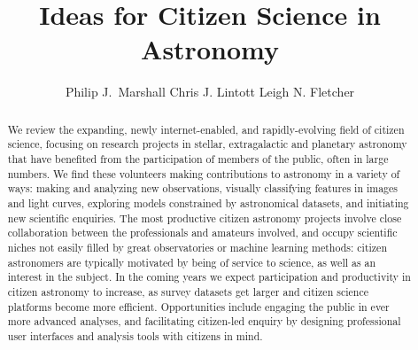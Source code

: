 \documentclass{ar2e}
\def\url#1{\texttt{#1}}
\begin{document}

\jvol{}
\ARinfo{}

\title{Ideas for Citizen Science in Astronomy}

\author{%
Philip J.\ Marshall
Chris J. Lintott
Leigh N. Fletcher
}




\begin{abstract} 

We review the expanding, newly internet-enabled, and rapidly-evolving field of
citizen science, focusing on research projects in stellar, extragalactic and 
planetary astronomy that have benefited from the participation of members of
the public, often in large numbers. We find these volunteers making
contributions to astronomy in a variety of ways: making and analyzing new
observations, visually classifying features in images and light curves,
exploring models constrained by astronomical datasets, and initiating new
scientific enquiries.  The most productive citizen astronomy projects involve
close collaboration between the professionals and amateurs involved, and occupy
scientific niches not easily filled by great observatories or machine learning
methods: citizen astronomers are typically motivated by being of service to
science, as well as an interest in the subject. In the coming years we expect participation and productivity in citizen
astronomy to increase, as survey datasets get larger and citizen science
platforms become more efficient. Opportunities include engaging the public in
ever more advanced analyses, and facilitating citizen-led enquiry by designing
professional user interfaces and analysis tools with citizens in mind.


\end{abstract}
\end{document}
